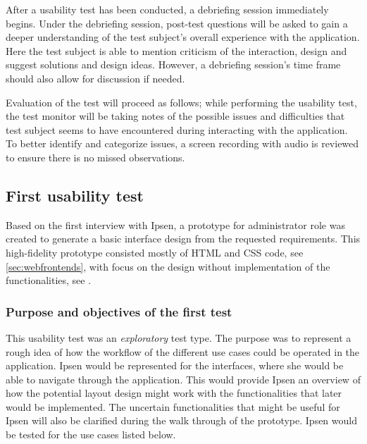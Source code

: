 After a usability test has been conducted, a debriefing session immediately begins.
Under the debriefing session, post-test questions will be asked to gain a deeper understanding of the test subject's overall experience with the application.
Here the test subject is able to mention criticism of the interaction, design and suggest solutions and design ideas.
However, a debriefing session's time frame should also allow for discussion if needed.

Evaluation of the test will proceed as follows; while performing the usability test, the test monitor will be taking notes of the possible issues and difficulties that test subject seems to have encountered during interacting with the application.
To better identify and categorize issues, a screen recording with audio is reviewed to ensure there is no missed observations.

\subsection{First usability test}\label{firsttest}
Based on the first interview with Ipsen, a prototype for administrator role was created to generate a basic interface design from the requested requirements.
This high-fidelity prototype consisted mostly of HTML and CSS code, see \cref{sec:webfrontends}, with focus on the design without implementation of the functionalities, see .

\subsubsection*{Purpose and objectives of the first test}
This usability test was an \textit{exploratory} test type.
The purpose was to represent a rough idea of how the workflow of the different use cases could be operated in the application.
Ipsen would be represented for the interfaces, where she would be able to navigate through the application.
This would provide Ipsen an overview of how the potential layout design might work with the functionalities that later would be implemented.
The uncertain functionalities that might be useful for Ipsen will also be clarified during the walk through of the prototype.
Ipsen would be tested for the use cases listed below.

